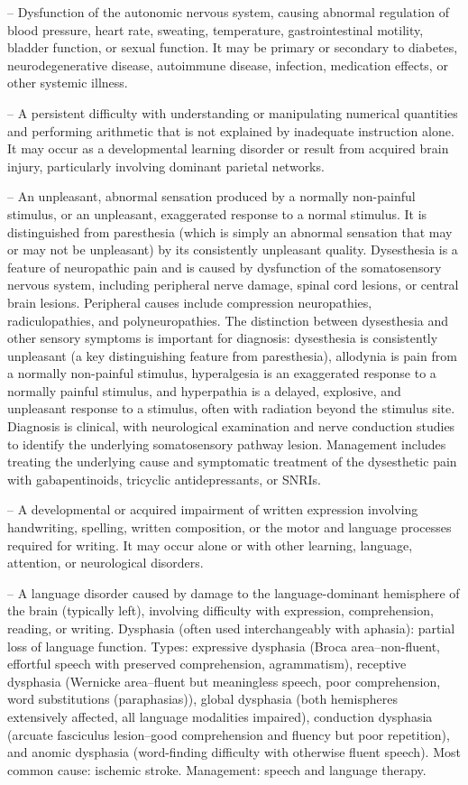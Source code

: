 -- Dysfunction of the autonomic nervous system, causing abnormal regulation of blood pressure, heart rate, sweating, temperature, gastrointestinal motility, bladder function, or sexual function. It may be primary or secondary to diabetes, neurodegenerative disease, autoimmune disease, infection, medication effects, or other systemic illness.

-- A persistent difficulty with understanding or manipulating numerical quantities and performing arithmetic that is not explained by inadequate instruction alone. It may occur as a developmental learning disorder or result from acquired brain injury, particularly involving dominant parietal networks.

-- An unpleasant, abnormal sensation produced by a normally non-painful stimulus, or an unpleasant, exaggerated response to a normal stimulus. It is distinguished from paresthesia (which is simply an abnormal sensation that may or may not be unpleasant) by its consistently unpleasant quality. Dysesthesia is a feature of neuropathic pain and is caused by dysfunction of the somatosensory nervous system, including peripheral nerve damage, spinal cord lesions, or central brain lesions. Peripheral causes include compression neuropathies, radiculopathies, and polyneuropathies. The distinction between dysesthesia and other sensory symptoms is important for diagnosis: dysesthesia is consistently unpleasant (a key distinguishing feature from paresthesia), allodynia is pain from a normally non-painful stimulus, hyperalgesia is an exaggerated response to a normally painful stimulus, and hyperpathia is a delayed, explosive, and unpleasant response to a stimulus, often with radiation beyond the stimulus site. Diagnosis is clinical, with neurological examination and nerve conduction studies to identify the underlying somatosensory pathway lesion. Management includes treating the underlying cause and symptomatic treatment of the dysesthetic pain with gabapentinoids, tricyclic antidepressants, or SNRIs.

-- A developmental or acquired impairment of written expression involving handwriting, spelling, written composition, or the motor and language processes required for writing. It may occur alone or with other learning, language, attention, or neurological disorders.

-- A language disorder caused by damage to the language-dominant hemisphere of the brain (typically left), involving difficulty with expression, comprehension, reading, or writing. Dysphasia (often used interchangeably with aphasia): partial loss of language function. Types: expressive dysphasia (Broca area--non-fluent, effortful speech with preserved comprehension, agrammatism), receptive dysphasia (Wernicke area--fluent but meaningless speech, poor comprehension, word substitutions (paraphasias)), global dysphasia (both hemispheres extensively affected, all language modalities impaired), conduction dysphasia (arcuate fasciculus lesion--good comprehension and fluency but poor repetition), and anomic dysphasia (word-finding difficulty with otherwise fluent speech). Most common cause: ischemic stroke. Management: speech and language therapy.

